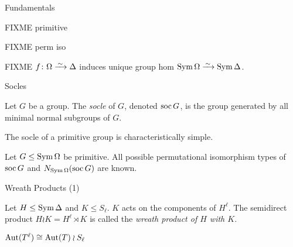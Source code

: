\begin{frame}{Fundamentals}
    \begin{defn}
        FIXME primitive
    \end{defn}
    \begin{defn}
        FIXME perm iso
    \end{defn}
    \begin{rem}
        FIXME
        $f \from \Omega \iso \Delta$ induces unique
        group hom
        $\sym \Omega \iso \sym \Delta$.
    \end{rem}
\end{frame}


\begin{frame}{Socles}
    \begin{defn}
        Let $G$ be a group. The \emph{socle} of $G$, denoted $\operatorname{soc} G$,
        is the group generated by all minimal normal subgroups of $G$.
    \end{defn}
    \pause

    \begin{thm}
        The socle of a primitive group is characteristically simple.
    \end{thm}
    \pause

    \begin{thm}
        Let $G \leq \operatorname{Sym} \Omega$ be primitive.
        All possible permutational isomorphism types of $\operatorname{soc} G$ and
        $N_{\operatorname{Sym} \Omega}(\operatorname{soc} G)$ are known.
    \end{thm}
\end{frame}

\begin{frame}{Wreath Products (1)}
    \begin{defn}
        Let $H \leq \operatorname{Sym} \Delta$ and $K \leq S_\ell$.
        $K$ acts on the components of $H ^ \ell$.
        \pause
        The semidirect product
        $H \wr K = H ^ \ell \rtimes K$
        is called the \emph{wreath product of $H$ with $K$}.
    \end{defn}
    \vspace{1em}
    \pause

    \begin{thm}
        $\operatorname{Aut}( T ^ \ell ) \cong \operatorname{Aut}(T) \wr S_\ell$
    \end{thm}
\end{frame}


